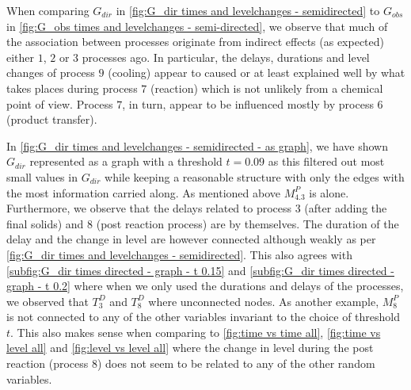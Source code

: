 \documentclass[../Thesis.tex]{subfiles}
\begin{document}
When comparing $G_{dir}$ in \autoref{fig:G_dir times and levelchanges - semidirected} to $G_{obs}$ in \autoref{fig:G_obs times and levelchanges - semi-directed}, we observe that much of the association between processes originate from indirect effects (as expected) either $1$, $2$ or $3$ processes ago. In particular, the delays, durations and level changes of process $9$ (cooling) appear to caused or at least explained well by what takes places during process $7$ (reaction) which is not unlikely from a chemical point of view. Process $7$, in turn, appear to be influenced mostly by process $6$ (product transfer).

In \autoref{fig:G_dir times and levelchanges - semidirected - as graph}, we have shown $G_{dir}$ represented as a graph with a threshold $t = 0.09$ as this filtered out most small values in $G_{dir}$ while keeping a reasonable structure with only the edges with the most information carried along. As mentioned above $M^P_{4.3}$ is alone. Furthermore, we observe that the delays related to process $3$ (after adding the final solids) and $8$ (post reaction process) are by themselves. The duration of the delay and the change in level are however connected although weakly as per \autoref{fig:G_dir times and levelchanges - semidirected}. This also agrees with \autoref{subfig:G_dir times directed - graph - t 0.15} and \autoref{subfig:G_dir times directed - graph - t 0.2} where when we only used the durations and delays of the processes, we observed that $T^D_3$ and $T^D_8$ where unconnected nodes. As another example, $M^P_8$ is not connected to any of the other variables invariant to the choice of threshold $t$. This also makes sense when comparing to \autoref{fig:time vs time all}, \autoref{fig:time vs level all} and \autoref{fig:level vs level all} where the change in level during the post reaction (process $8$) does not seem to be related to any of the other random variables.
\end{document}
